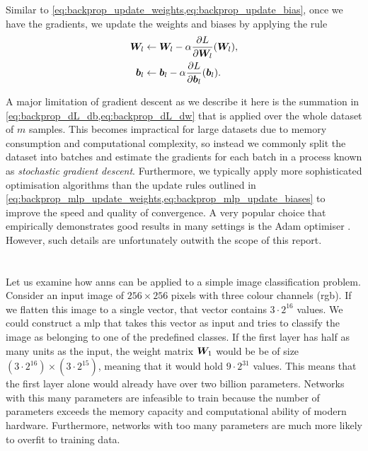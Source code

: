 \documentclass[../report.tex]{subfiles}
\begin{document}
Similar to \cref{eq:backprop_update_weights,eq:backprop_update_bias}, once we have the gradients, we update the weights and biases by applying the rule
\begin{align}
    \label{eq:backprop_mlp_update_weights}
    {\bm{W}}_l &\gets {\bm{W}}_l - \alpha \frac{\partial L}{\partial {\bm{W}}_l}({\bm{W}}_l),\\
    \label{eq:backprop_mlp_update_biases}
    {\bm{b}}_l &\gets {\bm{b}}_l - \alpha \frac{\partial L}{\partial {\bm{b}}_l}({\bm{b}}_l).
\end{align}

A major limitation of gradient descent as we describe it here is the summation in \cref{eq:backprop_dL_db,eq:backprop_dL_dw} that is applied over the whole dataset of $m$ samples. 
This becomes impractical for large datasets due to memory consumption and computational complexity, so instead we commonly split the dataset into batches and estimate the gradients for each batch in a process known as \emph{stochastic gradient descent}.
Furthermore, we typically apply more sophisticated optimisation algorithms than the update rules outlined in \cref{eq:backprop_mlp_update_weights,eq:backprop_mlp_update_biases} to improve the speed and quality of convergence.
A very popular choice that empirically demonstrates good results in many settings is the Adam optimiser \cite{kingma2017}.
However, such details are unfortunately outwith the scope of this report.

\section{}
\label{sec:cnns}
Let us examine how \glspl{ann} can be applied to a simple image classification problem.
Consider an input image of $256 \times 256$ pixels with three colour channels (\gls{rgb}).
If we flatten this image to a single vector, that vector contains $3 \cdot 2^{16}$ values.
We could construct a \gls{mlp} that takes this vector as input and tries to classify the image as belonging to one of the predefined classes.
If the first layer has half as many units as the input, the weight matrix ${\bm{W}}_1$ would be be of size $(3 \cdot 2^{16}) \times (3 \cdot 2^{15})$, meaning that it would hold $9 \cdot 2^{31}$ values.
This means that the first layer alone would already have over two billion parameters.
Networks with this many parameters are infeasible to train because the number of parameters exceeds the memory capacity and computational ability of modern hardware.
Furthermore, networks with too many parameters are much more likely to overfit to training data.
\end{document}
